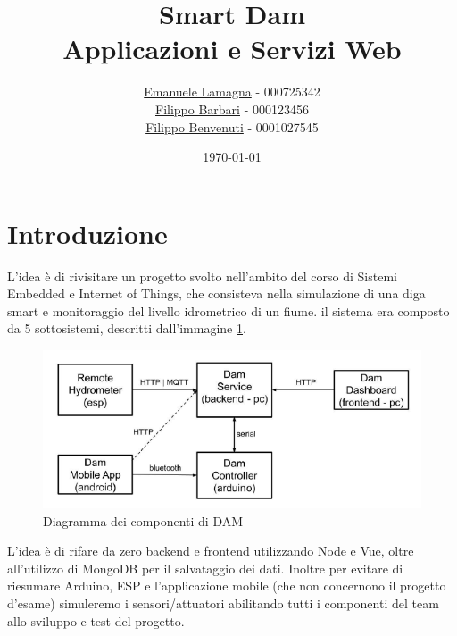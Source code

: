 \documentclass{article}
\title{
    Smart Dam \\
    \large Applicazioni e Servizi Web
}
\author{\href{mailto:emalama@studio.unibo.it}{Emanuele Lamagna} - 000725342\\\href{mailto:filippo.barbari@studio.unibo.it}{Filippo Barbari} - 000123456\\\href{mailto:filippo.benvenuti3@studio.unibo.it}{Filippo Benvenuti} - 0001027545}
\date{\today}
\begin{document}
\maketitle
\section*{Introduzione}\label{sec:intro}
L'idea è di rivisitare un progetto svolto nell'ambito del corso di Sistemi Embedded e Internet of Things, che consisteva nella simulazione di una diga smart e monitoraggio del livello idrometrico di un fiume. il sistema era composto da 5 sottosistemi, descritti dall'immagine \ref{fig:dam-scheme}.
\begin{figure}[h!]
	\centering
	\includegraphics[scale=0.7]{dam-scheme.png}
	\caption{Diagramma dei componenti di DAM}
	\label{fig:dam-scheme}
\end{figure}
L'idea è di rifare da zero backend e frontend utilizzando Node e Vue, oltre all'utilizzo di MongoDB per il salvataggio dei dati. Inoltre per evitare di riesumare Arduino, ESP e l'applicazione mobile (che non concernono il progetto d'esame) simuleremo i sensori/attuatori abilitando tutti i componenti del team allo sviluppo e test del progetto.
\end{document}
